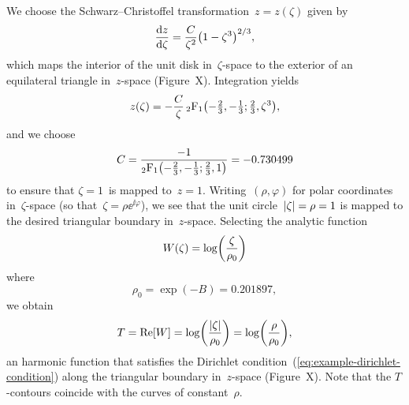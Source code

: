 We choose the Schwarz--Christoffel transformation~$z = z (\zeta)$
given by
\begin{equation}
  \tder{z}{\zeta} = \frac{C}{\zeta^2} \roundbr*{1 - \zeta^3}^{2/3},
  \label{eq:conformal_triangle-mapping-derivative}
\end{equation}
which maps the interior of the unit disk in~$\zeta$-space
to the exterior of an equilateral triangle in~$z$-space
(Figure~X\@). %
Integration yields
\begin{equation}
  z (\zeta) =
    -\frac{C}{\zeta}
    \hypergeo \roundbr*{-\tfrac{2}{3}, -\tfrac{1}{3}; \tfrac{2}{3}, \zeta^3},
  \label{eq:conformal_triangle-mapping}
\end{equation}
and we choose
\begin{equation}
  C =
    \frac{
      -1
    }{
      \hypergeo \roundbr*{-\tfrac{2}{3}, -\tfrac{1}{3}; \tfrac{2}{3}, 1}
    }
    = -0.730499
  \label{eq:conformal_triangle-mapping-constant}
\end{equation}
to ensure that $\zeta = 1$~is mapped to~$z = 1$.
Writing~$(\rho, \varphi)$ for polar coordinates in~$\zeta$-space
(so that~$\zeta = \rho \ee^{\ii \varphi}$),
we see that the unit circle~$\lvert\zeta\rvert = \rho = 1$
is mapped to the desired triangular boundary in~$z$-space.
Selecting the analytic function
\begin{equation}
  W (\zeta) = \log \roundbr*{\frac{\zeta}{\rho_0}}
  \label{eq:conformal_triangle-analytic-function}
\end{equation}
where
\begin{equation}
  \rho_0 = \exp (-B) = 0.201897,
  \label{eq:conformal_triangle-minimum-zeta-radius}
\end{equation}
we obtain
\begin{equation}
  T = \re [W]
    = \log \roundbr*{\frac{\abs{\zeta}}{\rho_0}}
    = \log \roundbr*{\frac{\rho}{\rho_0}},
  \label{eq:conformal_triangle-known-solution}
\end{equation}
an harmonic function that satisfies
the Dirichlet condition~(\ref{eq:example-dirichlet-condition})
along the triangular boundary in~$z$-space
(Figure~X\@). %
Note that the $T$-contours coincide
with the curves of constant~$\rho$.

